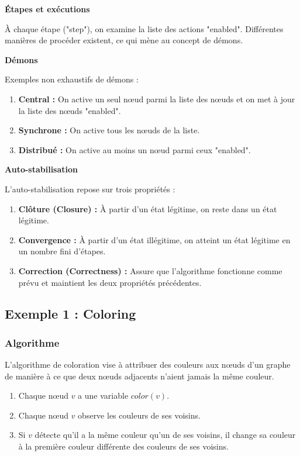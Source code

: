 \documentclass[11pt]{article}
\begin{document}
\textbf{\textbf{Étapes et exécutions}}

À chaque étape ("step"), on examine la liste des actions "enabled". 
Différentes manières de procéder existent, ce qui mène au concept de démons.

\textbf{\textbf{Démons}}

Exemples non exhaustifs de démons :
\begin{enumerate}
\item \textbf{\textbf{Central :}} On active un seul nœud parmi la liste des nœuds et on met à jour la liste des nœuds "enabled".
\item \textbf{\textbf{Synchrone :}} On active tous les nœuds de la liste.
\item \textbf{\textbf{Distribué :}} On active au moins un nœud parmi ceux "enabled".
\end{enumerate}

\textbf{\textbf{Auto-stabilisation}}

L'auto-stabilisation repose sur trois propriétés :
\begin{enumerate}
\item \textbf{\textbf{Clôture (Closure) :}} À partir d'un état légitime, on reste dans un état légitime.
\item \textbf{\textbf{Convergence :}} À partir d'un état illégitime, on atteint un état légitime en un nombre fini d'étapes.
\item \textbf{\textbf{Correction (Correctness) :}} Assure que l'algorithme fonctionne comme prévu et maintient les deux propriétés précédentes.
\end{enumerate}

\subsection{Exemple 1 : Coloring}
\label{sec:orgdbd3b8e}

\subsubsection{Algorithme}
\label{sec:org0f409e9}
L'algorithme de coloration vise à attribuer des couleurs aux nœuds d'un graphe de manière à ce que deux nœuds adjacents n'aient jamais la même couleur. 

\begin{enumerate}
\item Chaque nœud \(v\) a une variable \(color(v)\).
\item Chaque nœud \(v\) observe les couleurs de ses voisins.
\item Si \(v\) détecte qu'il a la même couleur qu'un de ses voisins, il change sa couleur à la première couleur différente des couleurs de ses voisins.
\end{enumerate}
\end{document}
